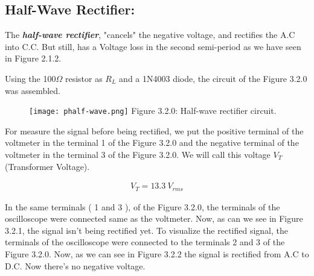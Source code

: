\subsection{Half-Wave Rectifier:}

The {\bfseries\itshape half-wave rectifier}, "cancels" the negative voltage, and rectifies the A.C into C.C. But still, has a Voltage loss in the second semi-period as we have seen in Figure 2.1.2. \hfill \break 

Using the 100$\Omega$ resistor as $R_{L}$ and a 1N4003 diode, the circuit of the Figure 3.2.0 was assembled. 

\begin{figure}[H]
\texttt{[image: phalf-wave.png]}
\centering \linebreak \linebreak Figure 3.2.0: Half-wave rectifier circuit.
\end{figure}

For measure the signal before being rectified, we put the positive terminal of the voltmeter in the terminal 1 of the Figure 3.2.0 and the negative terminal of the voltmeter in the terminal 3 of the Figure 3.2.0. We will call this voltage $V_{T}$ (Transformer Voltage).

\begin{ceqn}
\begin{align}
V_{T} = 13.3\ V_{rms}
\end{align}
\end{ceqn}

{\bfseries\itshape\color{OliveGreen}{Observation:}} {\bfseries\itshape{}} \hfill \break

\pagebreak

In the same terminals ( 1 and 3 ), of the Figure 3.2.0, the terminals of the oscilloscope were connected same as the voltmeter. Now, as can we see in Figure 3.2.1, the signal isn't being rectified yet. To visualize the rectified signal, the terminals of the oscilloscope were connected to the terminals 2 and 3 of the Figure 3.2.0. Now, as we can see in Figure 3.2.2 the signal is rectified from A.C to D.C. Now there's no negative voltage.

